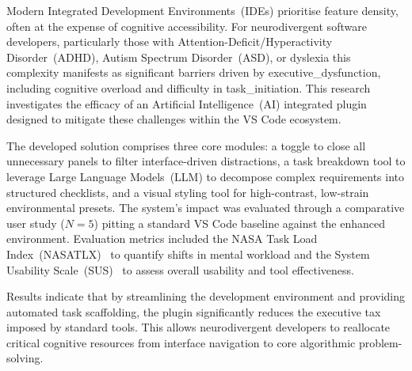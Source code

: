 Modern Integrated Development Environments~(\glspl{IDE}) prioritise feature density, often at the expense of cognitive accessibility. 
For \gls{neurodivergent} software developers, particularly those with Attention-Deficit/Hyperactivity Disorder~(\gls{ADHD}), Autism Spectrum Disorder~(\gls{ASD}), or \gls{dyslexia} this complexity manifests as 
significant barriers driven by \gls{executive_dysfunction}, including cognitive overload and difficulty in \gls{task_initiation}. 
This research investigates the efficacy of an Artificial Intelligence~(\gls{AI}) integrated plugin designed to mitigate these challenges within the VS Code 
ecosystem.


The developed solution comprises three core modules: a toggle to close all unnecessary panels to filter interface-driven distractions, 
a task breakdown tool to leverage Large Language Models~(\gls{LLM}) to decompose complex requirements into structured checklists, 
and a visual styling tool for high-contrast, low-strain environmental presets. The system's impact was evaluated through a comparative
 user study ($N=5$) pitting a standard VS Code baseline against the enhanced environment. Evaluation metrics included the 
NASA Task Load Index~(\gls{NASATLX})~\cite{NASATLX} to quantify shifts in mental workload and the System Usability Scale~(\gls{SUS})~\cite{Hyzy2022} to assess overall usability 
 and tool effectiveness.
 
 Results indicate that by streamlining the development environment and providing automated task \gls{scaffolding}, 
 the plugin significantly reduces the executive tax imposed by standard tools. This allows \gls{neurodivergent} developers to 
 reallocate critical cognitive resources from interface navigation to core algorithmic problem-solving.